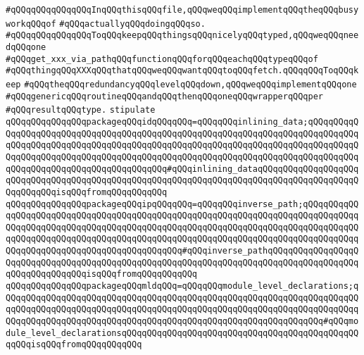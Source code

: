 \verb|#qQQqqQQqqQQqqQQqInqQQqthisqQQqfile,qQQqweqQQqimplementqQQqtheqQQqbusyworkqQQqof|\newline
\verb|#qQQqactuallyqQQqdoingqQQqso.|\newline
\verb|#qQQqqQQqqQQqqQQqToqQQqkeepqQQqthingsqQQqnicelyqQQqtyped,qQQqweqQQqneedqQQqone|\newline
\verb|#qQQqget_xxx_via_pathqQQqfunctionqQQqforqQQqeachqQQqtypeqQQqof|\newline
\verb|#qQQqthingqQQqXXXqQQqthatqQQqweqQQqwantqQQqtoqQQqfetch.qQQqqQQqToqQQqkeep|\newline
\verb|#qQQqtheqQQqredundancyqQQqlevelqQQqdown,qQQqweqQQqimplementqQQqone|\newline
\verb|#qQQqgenericqQQqroutineqQQqandqQQqthenqQQqoneqQQqwrapperqQQqper|\newline
\verb|#qQQqresultqQQqtype.|\newline
\newline
\newline
\verb|stipulate|\newline
\verb|qQQqqQQqqQQqqQQqpackageqQQqidqQQqqQQq=qQQqqQQqinlining_data;qQQqqQQqqQQqqQQqqQQqqQQqqQQqqQQqqQQqqQQqqQQqqQQqqQQqqQQqqQQqqQQqqQQqqQQqqQQqqQQqqQQqqQQqqQQqqQQqqQQqqQQqqQQqqQQqqQQqqQQqqQQqqQQqqQQqqQQqqQQqqQQqqQQqqQQqqQQqqQQqqQQqqQQqqQQqqQQqqQQqqQQqqQQqqQQqqQQqqQQqqQQqqQQqqQQqqQQqqQQqqQQqqQQqqQQqqQQqqQQqqQQqqQQqqQQq#qQQqinlining_dataqQQqqQQqqQQqqQQqqQQqqQQqqQQqqQQqqQQqqQQqqQQqqQQqqQQqqQQqqQQqqQQqqQQqqQQqqQQqqQQqqQQqqQQqqQQqqQQqqQQqisqQQqfromqQQqqQQqqQQq|\newline
\verb|qQQqqQQqqQQqqQQqpackageqQQqipqQQqqQQq=qQQqqQQqinverse_path;qQQqqQQqqQQqqQQqqQQqqQQqqQQqqQQqqQQqqQQqqQQqqQQqqQQqqQQqqQQqqQQqqQQqqQQqqQQqqQQqqQQqqQQqqQQqqQQqqQQqqQQqqQQqqQQqqQQqqQQqqQQqqQQqqQQqqQQqqQQqqQQqqQQqqQQqqQQqqQQqqQQqqQQqqQQqqQQqqQQqqQQqqQQqqQQqqQQqqQQqqQQqqQQqqQQqqQQqqQQqqQQqqQQqqQQqqQQqqQQqqQQqqQQqqQQqqQQq#qQQqinverse_pathqQQqqQQqqQQqqQQqqQQqqQQqqQQqqQQqqQQqqQQqqQQqqQQqqQQqqQQqqQQqqQQqqQQqqQQqqQQqqQQqqQQqqQQqqQQqqQQqqQQqqQQqisqQQqfromqQQqqQQqqQQq|\newline
\verb|qQQqqQQqqQQqqQQqpackageqQQqmldqQQq=qQQqqQQqmodule_level_declarations;qQQqqQQqqQQqqQQqqQQqqQQqqQQqqQQqqQQqqQQqqQQqqQQqqQQqqQQqqQQqqQQqqQQqqQQqqQQqqQQqqQQqqQQqqQQqqQQqqQQqqQQqqQQqqQQqqQQqqQQqqQQqqQQqqQQqqQQqqQQqqQQqqQQqqQQqqQQqqQQqqQQqqQQqqQQqqQQqqQQqqQQqqQQqqQQqqQQqqQQqqQQq#qQQqmodule_level_declarationsqQQqqQQqqQQqqQQqqQQqqQQqqQQqqQQqqQQqqQQqqQQqqQQqqQQqisqQQqfromqQQqqQQqqQQq|\newline
